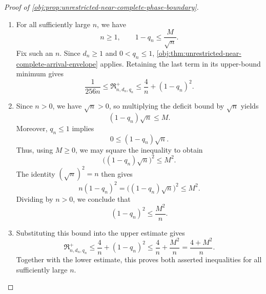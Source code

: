 \documentclass[11pt]{article}
\begin{document}
\begin{proof}[Proof of \cref{obj:prop:unrestricted-near-complete-phase-boundary}]
\begin{enumerate}
\item For all sufficiently large \(n\), we have
\[
n\ge1,
\qquad
1-q_n\le\frac{M}{\sqrt n}.
\]
Fix such an \(n\). Since \(d_n\ge1\) and \(0<q_n\le1\), \cref{obj:thm:unrestricted-near-complete-arrival-envelope} applies. Retaining the last term in its upper-bound minimum gives
\[
\frac{1}{256n}
\le \mathfrak R^{+}_{n,d_n,q_n}
\le \frac4n+(1-q_n)^2.
\]

\item Since \(n>0\), we have \(\sqrt n>0\), so multiplying the deficit bound by \(\sqrt n\) yields
\[
(1-q_n)\sqrt n\le M.
\]
Moreover, \(q_n\le1\) implies
\[
0\le(1-q_n)\sqrt n.
\]
Thus, using \(M\ge0\), we may square the inequality to obtain
\[
\bigl((1-q_n)\sqrt n\bigr)^2\le M^2.
\]
The identity \((\sqrt n)^2=n\) then gives
\[
n(1-q_n)^2
=
\bigl((1-q_n)\sqrt n\bigr)^2
\le M^2.
\]
Dividing by \(n>0\), we conclude that
\[
(1-q_n)^2\le\frac{M^2}{n}.
\]

\item Substituting this bound into the upper estimate gives
\[
\mathfrak R^{+}_{n,d_n,q_n}
\le \frac4n+(1-q_n)^2
\le \frac4n+\frac{M^2}{n}
=\frac{4+M^2}{n}.
\]
Together with the lower estimate, this proves both asserted inequalities for all sufficiently large \(n\).
\end{enumerate}
\end{proof}
\end{document}
